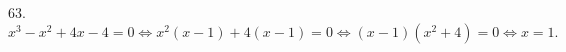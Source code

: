 63. $x^3-x^2+4x-4=0\Leftrightarrow x^2(x-1)+4(x-1)=0\Leftrightarrow (x-1)(x^2+4)=0\Leftrightarrow x=1.$\\
